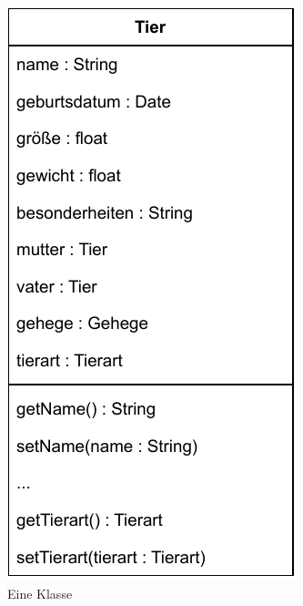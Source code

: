 \begin{figure}[h!]
	\centering
	\includegraphics[scale=1.0]{Bilder/Kapitel-8/klasse_tier.pdf}
	\caption{Eine Klasse }
	\label{fig:klasse_tier}
\end{figure}